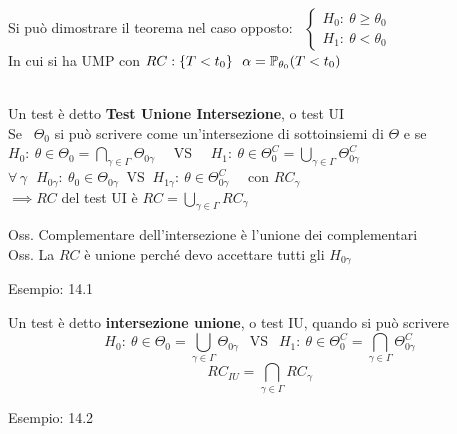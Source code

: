 Si può dimostrare il teorema nel caso opposto: \ $\begin{cases}
    H_0 : \ \theta\ge\theta_0\\
    H_1 : \ \theta < \theta_0 
\end{cases}$ \\ 
In cui si ha UMP con $RC : \{T<t_0\} \ \ \alpha=\PP_{\theta_0}(T<t_0)$\\ \\


\begin{defi}
    Un test è detto \textbf{Test Unione Intersezione}, o test UI\\ Se \ $\Theta_0$ si può scrivere come un'intersezione di sottoinsiemi di $\Theta$ e se\\
    $H_0 : \ \theta\in \Theta_0 = \underset{\gamma\in\Gamma}{\bigcap} \Theta_{0\gamma}$ \ \ VS \ \ $H_1 : \ \theta\in\Theta_0^C= \underset{\gamma\in\Gamma}{\bigcup} \Theta_{0\gamma}^C$\\
    $\forall\,\gamma \ \ \ H_{0\gamma} : \  \theta_0\in\Theta_{0\gamma} \ \text{ VS } \ H_{1\gamma} : \ \theta\in \Theta_{0\gamma}^C$ \ \ con $RC_{\gamma}$\\
    $\implies RC$ del test UI è $RC=\underset{\gamma\in\Gamma}{\bigcup}  RC_{\gamma}$ 
\end{defi}

Oss. Complementare dell'intersezione è l'unione dei complementari\\
Oss. La $RC$ è unione perché devo accettare tutti gli $H_{0\gamma}$


Esempio: 14.1\\


\begin{defi}
    Un test è detto \textbf{intersezione unione}, o test IU, quando si può scrivere
    \[
    H_0 : \ \theta\in \Theta_0 = \underset{{\gamma\in\Gamma}}{\bigcup} \Theta_{0\gamma} \ \ \text{ VS } \ \ H_1 : \ \theta\in \Theta_0^C = \underset{{\gamma\in\Gamma}}{\bigcap} \Theta_{0\gamma}^C
    \]
    \[
    RC_{IU}= \underset{\gamma\in\Gamma}{\bigcap} RC_{\gamma}
    \]
\end{defi}


Esempio: 14.2\\ \\




